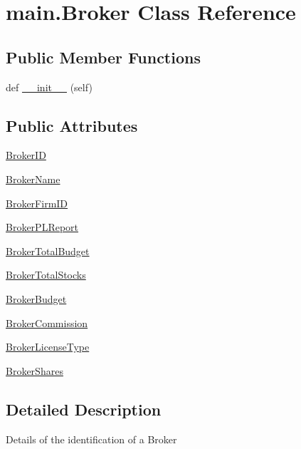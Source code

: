 \hypertarget{classmain_1_1_broker}{}\section{main.\+Broker Class Reference}
\label{classmain_1_1_broker}
\subsection*{Public Member Functions}
\begin{DoxyCompactItemize}
\item 
def \hyperlink{classmain_1_1_broker_a1fb9ac133b225d1bc819eb08a5ecdeda}{\+\_\+\+\_\+init\+\_\+\+\_\+} (self)
\end{DoxyCompactItemize}
\subsection*{Public Attributes}
\begin{DoxyCompactItemize}
\item 
\hyperlink{classmain_1_1_broker_a5a892f315cd01f8e6cf59a8954f4a85e}{Broker\+I\+D}
\item 
\hyperlink{classmain_1_1_broker_a1277c631e5c6686ac9f1da463d8f2f0b}{Broker\+Name}
\item 
\hyperlink{classmain_1_1_broker_ac09ccdbda32bd7760975aa05e4253223}{Broker\+Firm\+I\+D}
\item 
\hyperlink{classmain_1_1_broker_a97f90d52fd82543ecf738a0f7a46cea1}{Broker\+P\+L\+Report}
\item 
\hyperlink{classmain_1_1_broker_a4466c604b69d2f0922abf2283564c8d1}{Broker\+Total\+Budget}
\item 
\hyperlink{classmain_1_1_broker_afba91c0ecbf020fcfaee48ff04562005}{Broker\+Total\+Stocks}
\item 
\hyperlink{classmain_1_1_broker_a877e5e94f5cfb35ba42b2e406d2f0853}{Broker\+Budget}
\item 
\hyperlink{classmain_1_1_broker_a05aaff17153c349a1d23bd60356a8783}{Broker\+Commission}
\item 
\hyperlink{classmain_1_1_broker_a8e564d67320d28a4035fa390f5aec183}{Broker\+License\+Type}
\item 
\hyperlink{classmain_1_1_broker_a3bc95333d08957b412d05fec8c41384d}{Broker\+Shares}
\end{DoxyCompactItemize}


\subsection{Detailed Description}
\begin{DoxyVerb}Details of the identification of a Broker\end{DoxyVerb}
 

